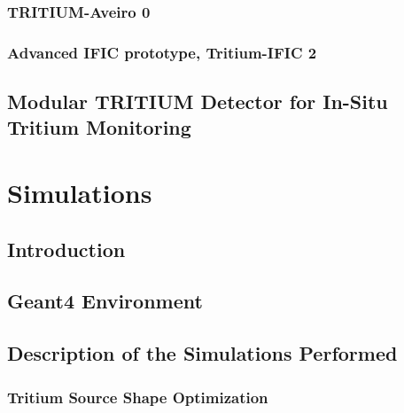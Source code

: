 \documentclass[12pt,a4paper]{book}
\begin{document}
		\subsection{TRITIUM-Aveiro 0}\label{subsec:TritiumAveiro}
		
		
		\subsection[TRITIUM-IFIC 2]{Advanced IFIC prototype, Tritium-IFIC 2}\label{subsec:TritiumIFIC2}
		
		\newpage
		
	\section[Modular TRITIUM Detector]{Modular TRITIUM Detector for In-Situ Tritium Monitoring}\label{sec:TritiumMonitor}
	
	\newpage

\chapter{Simulations}  \label{chap:Simulations}
	\section{Introduction}\label{sec:IntroSimulations}
	
	\newpage
	
	\section{Geant4 Environment}\label{sec:Geant4Environment}
	
	\newpage
	
	\section{Description of the Simulations Performed}\label{sec:SimulationsPerformed}
	
	
		\subsection[Tritium Source Shape]{Tritium Source Shape Optimization}\label{subsec:SourceShapeSimulation}
		
		
\end{document}
